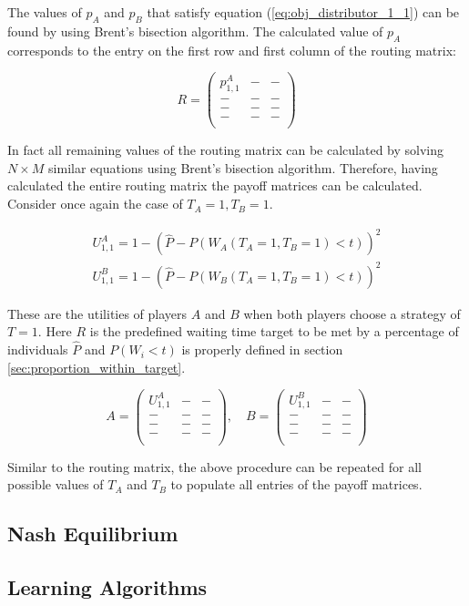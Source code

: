 The values of \(p_A\) and \(p_B\) that satisfy equation 
(\ref{eq:obj_distributor_1_1}) can be found by using Brent's bisection 
algorithm.
The calculated value of \(p_A\) corresponds to the entry on the first row and 
first column of the routing matrix:

\begin{equation}\label{eq:routing_matrix_1_1}
    R = 
    \begin{pmatrix}
        p_{1,1}^A & - & - \\
        - & - & - \\
        - & - & - \\
        - & - & - \\
    \end{pmatrix}
\end{equation}

In fact all remaining values of the routing matrix can be calculated by
solving \(N \times M\) similar equations using Brent's bisection algorithm.
Therefore, having calculated the entire routing matrix the payoff matrices can
be calculated.
Consider once again the case of \(T_A=1, T_B=1\). 


\begin{align}
    U_{1, 1}^A = 1 -\left( 
        \hat{P} - P(W_A(T_A=1, T_B=1) < t) 
    \right)^2 \nonumber
    \\
    U_{1, 1}^B = 1 -\left( 
        \hat{P} - P(W_B(T_A=1, T_B=1) < t) 
    \right)^2 \label{eq:payoff_entry_1_1}
\end{align}

These are the utilities of players \(A\) and \(B\) when both players choose a
strategy of \(T = 1\).
Here \(R\) is the predefined waiting time target to be met by a percentage of 
individuals \( \hat{P} \) and \(P(W_i < t)\) is properly defined in section
\ref{sec:proportion_within_target}.

\begin{equation}\label{eq:payoff_matrices_1_1}
    A = 
    \begin{pmatrix}
        U_{1, 1}^A & - & - \\
        - & - & - \\
        - & - & - \\
        - & - & - \\
    \end{pmatrix}, \quad
    B = 
    \begin{pmatrix}
        U_{1, 1}^B & - & - \\
        - & - & - \\
        - & - & - \\
        - & - & - \\
    \end{pmatrix}
\end{equation}

Similar to the routing matrix, the above procedure can be repeated for all 
possible values of \(T_A\) and \(T_B\) to populate all entries of the payoff 
matrices. 

\subsection{Nash Equilibrium}

\subsection{Learning Algorithms}
